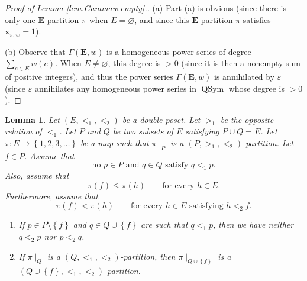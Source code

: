 \documentclass[12pt]{article}
\theoremstyle{plain}
\newtheorem{lemma}[theorem]{Lemma}
\theoremstyle{definition}
\theoremstyle{remark}
\let\sumnonlimits\sum
\renewcommand{\sum}{\sumnonlimits\limits}
\newcommand{\xx}{{\mathbf{x}}}
\newcommand{\QSym}{{\operatorname{QSym}}}
\newcommand{\EE}{{\mathbf{E}}}
\begin{document}
\begin{proof}
[Proof of Lemma \ref{lem.Gammaw.empty}.] (a) Part (a) is obvious (since there is
only one $\EE$-partition $\pi$ when $E=\varnothing$, and since
this $\EE$-partition $\pi$ satisfies $\xx_{\pi, w} = 1$).

(b) Observe that $\Gamma \left( \EE, w \right)$ is a homogeneous power
series of degree $\sum_{e\in E} w\left( e \right)$. When $E \neq \varnothing$,
this degree is $>0$ (since it is then a nonempty sum of positive integers),
and thus the power series $\Gamma \left( \EE, w \right)$
is annihilated by $\varepsilon$ (since $\varepsilon$ annihilates any
homogeneous power series in $\QSym$ whose degree is $> 0$).
\end{proof}

\begin{lemma}
\label{lem.Gammaw.toggle}
Let $\left(E, <_1, <_2\right)$ be a double poset. Let $>_1$ be the opposite
relation of $<_1$. Let $P$ and $Q$ be two
subsets of $E$ satisfying $P \cup Q = E$.
Let $\pi : E \to \left\{1, 2, 3, \ldots\right\}$ be a map such
that $\pi \mid_P$ is a $\left(P, >_1, <_2\right)$-partition.
Let $f \in P$. Assume that
\begin{equation}
\text{no } p \in P \text{ and } q \in Q \text{ satisfy }
q <_1 p.
\label{eq.lem.Gammaw.toggle.eq0}
\end{equation}
Also, assume that
\begin{equation}
\pi\left( f \right) \leq \pi\left( h \right)
\qquad \text{for every } h \in E .
\label{eq.lem.Gammaw.toggle.eq1}
\end{equation}
Furthermore, assume that
\begin{equation}
\pi \left( f \right) < \pi \left( h \right)
\qquad \text{for every } h \in E \text{ satisfying } h <_2 f .
\label{eq.lem.Gammaw.toggle.eq2}
\end{equation}

\begin{enumerate}
\item[(a)] If $p \in P \setminus \left\{f\right\}$
and $q \in Q \cup \left\{f\right\}$ are such that
$q <_1 p$, then we have neither $q <_2 p$ nor
$p <_2 q$.

\item[(b)] If $\pi \mid_Q$ is a $\left(Q, <_1, <_2\right)$-partition,
then
$\pi \mid_{Q \cup \left\{f\right\}}$ is a
$\left(Q \cup \left\{f\right\}, <_1, <_2\right)$-partition.
\end{enumerate}
\end{lemma}
\end{document}
